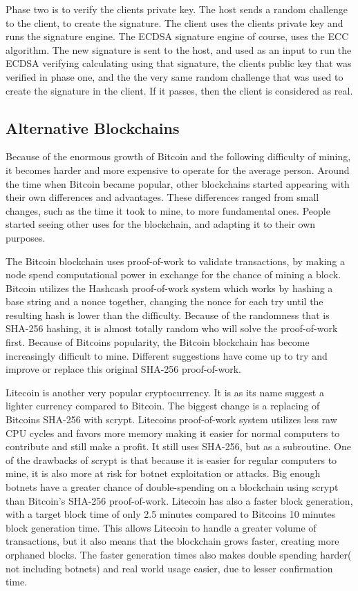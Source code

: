 \documentclass[12pt]{article}
\begin{document}
Phase two is to verify the clients private key. The host sends a random challenge to the client, to create the signature. The client uses the clients private key and runs the signature engine. The ECDSA signature engine of course, uses the ECC algorithm. The new signature is sent to the host, and used as an input to run the ECDSA verifying calculating using that signature, the clients public key that was verified in phase one, and the the very same random challenge that was used to create the signature in the client. If it passes, then the client is considered as real. 

\subsection{Alternative Blockchains}\label{subsec:difblocks}
Because of the enormous growth of Bitcoin and the following difficulty of mining, it becomes harder and more expensive to operate for the average person. Around the time when Bitcoin became popular, other blockchains started appearing with their own differences and advantages. These differences ranged from small changes, such as the time it took to mine, to more fundamental ones. People started seeing other uses for the blockchain, and adapting it to their own purposes. 

The Bitcoin blockchain uses proof-of-work to validate transactions, by making a node spend computational power in exchange for the chance of mining a block. Bitcoin utilizes the Hashcash\cite{hashcash} proof-of-work system which works by hashing a base string and a nonce together, changing the nonce for each try until the resulting hash is lower than the difficulty. Because of the randomness that is SHA-256 hashing, it is almost totally random who will solve the proof-of-work first. Because of Bitcoins popularity, the Bitcoin blockchain has become increasingly difficult to mine. Different suggestions have come up to try and improve or replace this original SHA-256 proof-of-work. 

Litecoin is another very popular cryptocurrency. It is as its name suggest a lighter currency compared to Bitcoin. The biggest change is a replacing of Bitcoins SHA-256 with scrypt. Litecoins proof-of-work system utilizes less raw CPU cycles and favors more memory making it easier for normal computers to contribute and still make a profit. It still uses SHA-256, but as a subroutine. One of the drawbacks of scrypt is that because it is easier for regular computers to mine, it is also more at risk for botnet exploitation or attacks. Big enough botnets have a greater chance of double-spending on a blockchain using scrypt than Bitcoin's SHA-256 proof-of-work. Litecoin has also a faster block generation, with a target block time of only 2.5 minutes compared to Bitcoins 10 minutes block generation time. This allows Litecoin to handle a greater volume of transactions, but it also means that the blockchain grows faster, creating more orphaned blocks. The faster generation times also makes double spending harder( not including botnets) and real world usage easier, due to lesser confirmation time. 
\end{document}
